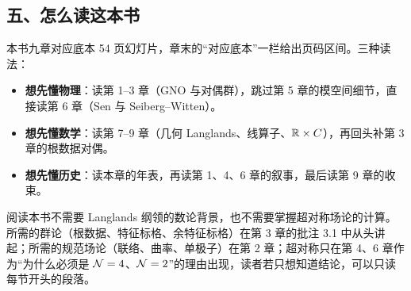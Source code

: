 \subsection*{五、怎么读这本书}

本书九章对应底本 54 页幻灯片，章末的“对应底本”一栏给出页码区间。三种读法：

\begin{itemize}
  \item \textbf{想先懂物理}：读第 1--3 章（GNO 与对偶群），跳过第 5 章的模空间细节，直接读第 6 章（Sen 与 Seiberg--Witten）。
  \item \textbf{想先懂数学}：读第 7--9 章（几何 Langlands、线算子、$\mathbb{R}\times C$），再回头补第 3 章的根数据对偶。
  \item \textbf{想先懂历史}：读本章的年表，再读第 1、4、6 章的叙事，最后读第 9 章的收束。
\end{itemize}

阅读本书不需要 Langlands 纲领的数论背景，也不需要掌握超对称场论的计算。所需的群论（根数据、特征标格、余特征标格）在第 3 章的批注 3.1 中从头讲起；所需的规范场论（联络、曲率、单极子）在第 2 章；超对称只在第 4、6 章作为“为什么必须是 $\mathcal{N}=4$、$\mathcal{N}=2$”的理由出现，读者若只想知道结论，可以只读每节开头的段落。
